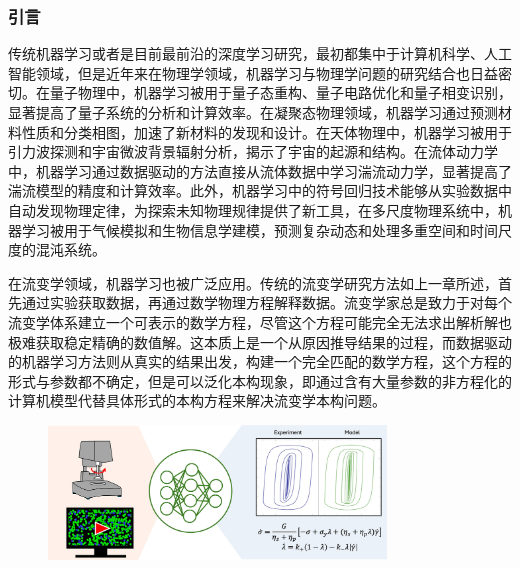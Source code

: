 \subsubsection{引言}
传统机器学习或者是目前最前沿的深度学习研究，最初都集中于计算机科学、人工智能领域，但是近年来在物理学领域，机器学习与物理学问题的研究结合也日益密切\cite{choudhary2022recent}。在量子物理中，机器学习被用于量子态重构、量子电路优化和量子相变识别，显著提高了量子系统的分析和计算效率\cite{biamonte2017quantum}。在凝聚态物理领域，机器学习通过预测材料性质和分类相图，加速了新材料的发现和设计\cite{choudhary2022recent}。在天体物理中，机器学习被用于引力波探测和宇宙微波背景辐射分析，揭示了宇宙的起源和结构\cite{bufano2023machine}。在流体动力学中，机器学习通过数据驱动的方法直接从流体数据中学习湍流动力学，显著提高了湍流模型的精度和计算效率\cite{bruntonMachineLearningFluid2020}。此外，机器学习中的符号回归技术能够从实验数据中自动发现物理定律，为探索未知物理规律提供了新工具\cite{udrescuAIFeynmanPhysicsinspired2020}，在多尺度物理系统中，机器学习被用于气候模拟和生物信息学建模，预测复杂动态和处理多重空间和时间尺度的混沌系统。

在流变学领域，机器学习也被广泛应用。传统的流变学研究方法如上一章所述，首先通过实验获取数据，再通过数学物理方程解释数据。流变学家总是致力于对每个流变学体系建立一个可表示的数学方程，尽管这个方程可能完全无法求出解析解也极难获取稳定精确的数值解。这本质上是一个从原因推导结果的过程，而数据驱动的机器学习方法则从真实的结果出发，构建一个完全匹配的数学方程，这个方程的形式与参数都不确定，但是可以泛化本构现象，即通过含有大量参数的非方程化的计算机模型代替具体形式的本构方程来解决流变学本构问题\cite{colenMachineLearningActivenematic2021,bahiuddinReviewModelingSchemes2024,mangalDatadrivenTechniquesRheology2025}。
\begin{figure}[htbp]
  \centering
  \includegraphics[width=0.8\textwidth]{Fig/datadrivenintro.jpg}
\end{figure}

